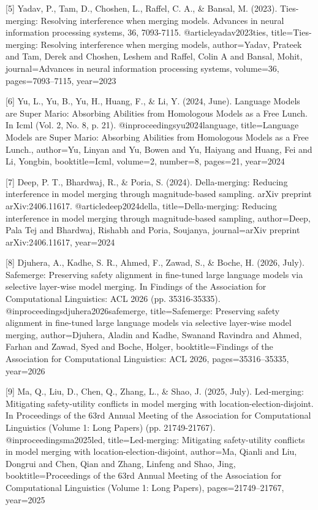 \documentclass{article}
\begin{document}
{[5] Yadav, P., Tam, D., Choshen, L., Raffel, C. A., & Bansal, M. (2023). Ties-merging: Resolving interference when merging models. Advances in neural information processing systems, 36, 7093-7115.
@article{yadav2023ties,
  title={Ties-merging: Resolving interference when merging models},
  author={Yadav, Prateek and Tam, Derek and Choshen, Leshem and Raffel, Colin A and Bansal, Mohit},
  journal={Advances in neural information processing systems},
  volume={36},
  pages={7093--7115},
  year={2023}
}

[6] Yu, L., Yu, B., Yu, H., Huang, F., & Li, Y. (2024, June). Language Models are Super Mario: Absorbing Abilities from Homologous Models as a Free Lunch. In Icml (Vol. 2, No. 8, p. 21).
@inproceedings{yu2024language,
  title={Language Models are Super Mario: Absorbing Abilities from Homologous Models as a Free Lunch.},
  author={Yu, Linyan and Yu, Bowen and Yu, Haiyang and Huang, Fei and Li, Yongbin},
  booktitle={Icml},
  volume={2},
  number={8},
  pages={21},
  year={2024}
}

[7] Deep, P. T., Bhardwaj, R., & Poria, S. (2024). Della-merging: Reducing interference in model merging through magnitude-based sampling. arXiv preprint arXiv:2406.11617.
@article{deep2024della,
  title={Della-merging: Reducing interference in model merging through magnitude-based sampling},
  author={Deep, Pala Tej and Bhardwaj, Rishabh and Poria, Soujanya},
  journal={arXiv preprint arXiv:2406.11617},
  year={2024}
}

[8] Djuhera, A., Kadhe, S. R., Ahmed, F., Zawad, S., & Boche, H. (2026, July). Safemerge: Preserving safety alignment in fine-tuned large language models via selective layer-wise model merging. In Findings of the Association for Computational Linguistics: ACL 2026 (pp. 35316-35335).
@inproceedings{djuhera2026safemerge,
  title={Safemerge: Preserving safety alignment in fine-tuned large language models via selective layer-wise model merging},
  author={Djuhera, Aladin and Kadhe, Swanand Ravindra and Ahmed, Farhan and Zawad, Syed and Boche, Holger},
  booktitle={Findings of the Association for Computational Linguistics: ACL 2026},
  pages={35316--35335},
  year={2026}
}

[9] Ma, Q., Liu, D., Chen, Q., Zhang, L., & Shao, J. (2025, July). Led-merging: Mitigating safety-utility conflicts in model merging with location-election-disjoint. In Proceedings of the 63rd Annual Meeting of the Association for Computational Linguistics (Volume 1: Long Papers) (pp. 21749-21767).
@inproceedings{ma2025led,
  title={Led-merging: Mitigating safety-utility conflicts in model merging with location-election-disjoint},
  author={Ma, Qianli and Liu, Dongrui and Chen, Qian and Zhang, Linfeng and Shao, Jing},
  booktitle={Proceedings of the 63rd Annual Meeting of the Association for Computational Linguistics (Volume 1: Long Papers)},
  pages={21749--21767},
  year={2025}
}

}
\end{document}
